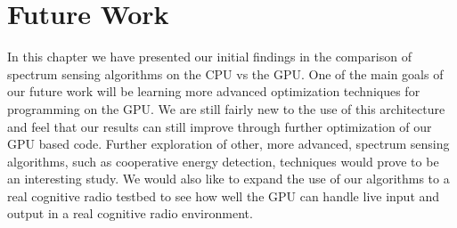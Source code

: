 \section{Future Work}
\label{sect:gpu_future_work}
In this chapter we have presented our initial findings in the comparison of spectrum sensing algorithms on the CPU vs the GPU.  One of the main goals of our future work will be learning more advanced optimization techniques for programming on the GPU.  We are still fairly new to the use of this architecture and feel that our results can still improve through further optimization of our GPU based code.
Further exploration of other, more advanced, spectrum sensing algorithms, such as cooperative energy detection, techniques would prove to be an interesting study.  We would also like to expand the use of our algorithms to a real cognitive radio testbed to see how well the GPU can handle live input and output in a real cognitive radio environment.
